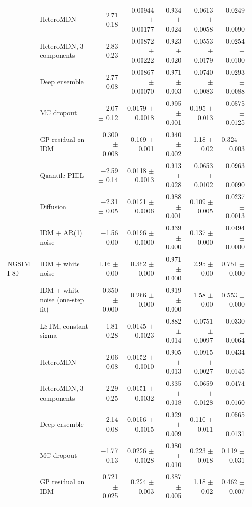 \begin{longtable}{llrrrrr}
 & HeteroMDN & $-$2.71 $\pm$ 0.18 & 0.00944 $\pm$ 0.00177 & 0.934 $\pm$ 0.024 & 0.0613 $\pm$ 0.0058 & 0.0249 $\pm$ 0.0090 \\
 & HeteroMDN, 3 components & $-$2.83 $\pm$ 0.23 & 0.00872 $\pm$ 0.00222 & 0.923 $\pm$ 0.020 & 0.0553 $\pm$ 0.0179 & 0.0254 $\pm$ 0.0100 \\
 & Deep ensemble & $-$2.77 $\pm$ 0.08 & 0.00867 $\pm$ 0.00070 & 0.971 $\pm$ 0.003 & 0.0740 $\pm$ 0.0083 & 0.0293 $\pm$ 0.0088 \\
 & MC dropout & $-$2.07 $\pm$ 0.12 & 0.0179 $\pm$ 0.0018 & 0.995 $\pm$ 0.001 & 0.195 $\pm$ 0.013 & 0.0575 $\pm$ 0.0125 \\
 & GP residual on IDM & 0.300 $\pm$ 0.008 & 0.169 $\pm$ 0.001 & 0.940 $\pm$ 0.002 & 1.18 $\pm$ 0.02 & 0.324 $\pm$ 0.003 \\
 & Quantile PIDL & $-$2.59 $\pm$ 0.14 & 0.0118 $\pm$ 0.0013 & 0.913 $\pm$ 0.028 & 0.0653 $\pm$ 0.0102 & 0.0963 $\pm$ 0.0090 \\
 & Diffusion & $-$2.31 $\pm$ 0.05 & 0.0121 $\pm$ 0.0006 & 0.988 $\pm$ 0.001 & 0.109 $\pm$ 0.005 & 0.0237 $\pm$ 0.0013 \\
 & IDM + AR(1) noise & $-$1.56 $\pm$ 0.00 & 0.0196 $\pm$ 0.0000 & 0.939 $\pm$ 0.000 & 0.137 $\pm$ 0.000 & 0.0494 $\pm$ 0.0000 \\
\midrule
NGSIM I-80 & IDM + white noise & 1.16 $\pm$ 0.00 & 0.352 $\pm$ 0.000 & 0.971 $\pm$ 0.000 & 2.95 $\pm$ 0.00 & 0.751 $\pm$ 0.000 \\
 & IDM + white noise (one-step fit) & 0.850 $\pm$ 0.000 & 0.266 $\pm$ 0.000 & 0.919 $\pm$ 0.000 & 1.58 $\pm$ 0.00 & 0.553 $\pm$ 0.000 \\
 & LSTM, constant sigma & $-$1.81 $\pm$ 0.28 & 0.0145 $\pm$ 0.0023 & 0.882 $\pm$ 0.014 & 0.0751 $\pm$ 0.0097 & 0.0330 $\pm$ 0.0064 \\
 & HeteroMDN & $-$2.06 $\pm$ 0.08 & 0.0152 $\pm$ 0.0010 & 0.905 $\pm$ 0.013 & 0.0915 $\pm$ 0.0027 & 0.0434 $\pm$ 0.0145 \\
 & HeteroMDN, 3 components & $-$2.29 $\pm$ 0.25 & 0.0151 $\pm$ 0.0032 & 0.835 $\pm$ 0.018 & 0.0659 $\pm$ 0.0128 & 0.0474 $\pm$ 0.0160 \\
 & Deep ensemble & $-$2.14 $\pm$ 0.08 & 0.0156 $\pm$ 0.0015 & 0.929 $\pm$ 0.009 & 0.110 $\pm$ 0.011 & 0.0565 $\pm$ 0.0131 \\
 & MC dropout & $-$1.77 $\pm$ 0.13 & 0.0226 $\pm$ 0.0028 & 0.980 $\pm$ 0.010 & 0.223 $\pm$ 0.018 & 0.119 $\pm$ 0.031 \\
 & GP residual on IDM & 0.721 $\pm$ 0.025 & 0.224 $\pm$ 0.003 & 0.887 $\pm$ 0.005 & 1.18 $\pm$ 0.02 & 0.462 $\pm$ 0.007 \\

\end{longtable}
